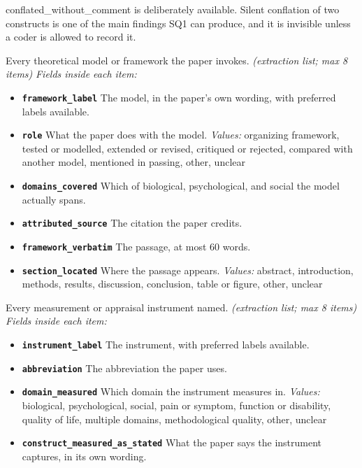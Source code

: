 \documentclass[11pt]{article}
\begin{document}
\begin{description}
{\small conflated\_without\_comment is deliberately available. Silent conflation of two constructs is one of the main findings SQ1 can produce, and it is invisible unless a coder is allowed to record it.}
\item[\texttt{theoretical\_frameworks}] Every theoretical model or framework the paper invokes. \textit{(extraction list; max 8 items)}
  {\small\itshape Fields inside each item:}
  \begin{itemize}[leftmargin=1.3em,itemsep=1pt,topsep=2pt]
  \item \textbf{\texttt{framework\_label}} The model, in the paper's own wording, with preferred labels available.
  \item \textbf{\texttt{role}} What the paper does with the model. {\small \textit{Values:} organizing framework, tested or modelled, extended or revised, critiqued or rejected, compared with another model, mentioned in passing, other, unclear}
  \item \textbf{\texttt{domains\_covered}} Which of biological, psychological, and social the model actually spans.
  \item \textbf{\texttt{attributed\_source}} The citation the paper credits.
  \item \textbf{\texttt{framework\_verbatim}} The passage, at most 60 words.
  \item \textbf{\texttt{section\_located}} Where the passage appears. {\small \textit{Values:} abstract, introduction, methods, results, discussion, conclusion, table or figure, other, unclear}
  \end{itemize}
\item[\texttt{instruments}] Every measurement or appraisal instrument named. \textit{(extraction list; max 8 items)}
  {\small\itshape Fields inside each item:}
  \begin{itemize}[leftmargin=1.3em,itemsep=1pt,topsep=2pt]
  \item \textbf{\texttt{instrument\_label}} The instrument, with preferred labels available.
  \item \textbf{\texttt{abbreviation}} The abbreviation the paper uses.
  \item \textbf{\texttt{domain\_measured}} Which domain the instrument measures in. {\small \textit{Values:} biological, psychological, social, pain or symptom, function or disability, quality of life, multiple domains, methodological quality, other, unclear}
  \item \textbf{\texttt{construct\_measured\_as\_stated}} What the paper says the instrument captures, in its own wording.

\end{itemize}
\end{description}
\end{document}
